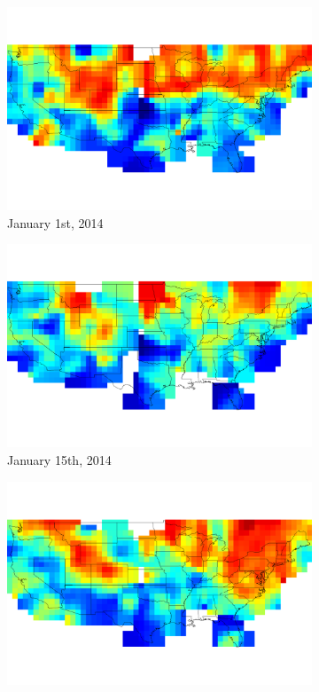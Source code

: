 \documentclass[10pt,twocolumn,letterpaper]{article}
\begin{document}
\begin{figure}
  \centering
  \begin{subfigure}[b]{0.3\textwidth}
    \centering
		\includegraphics[width=\textwidth, trim= 0mm 20mm 0mm 0mm]{figs/snow_map_1.pdf}
    \caption{January 1st, 2014}
    \label{fig:snow_map_1}
  \end{subfigure}
  \begin{subfigure}[b]{0.3\textwidth}
    \centering
		\includegraphics[width=\textwidth, trim= 0mm 20mm 0mm 0mm]{figs/snow_map_2.pdf}
    \caption{January 15th, 2014}
    \label{fig:snow_map_2}
  \end{subfigure}
  \begin{subfigure}[b]{0.3\textwidth}
    \centering
		\includegraphics[width=\textwidth, trim= 0mm 20mm 0mm 0mm]{figs/snow_map_3.pdf}

\end{subfigure}
\end{figure}
\end{document}
